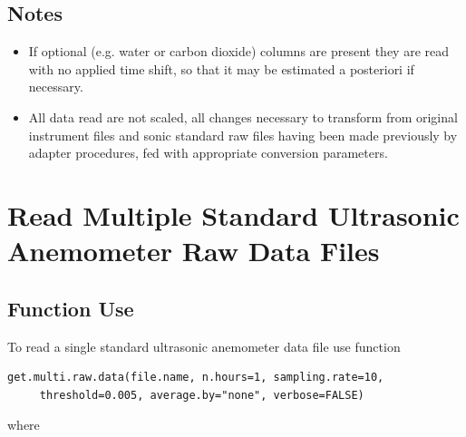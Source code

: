 \documentclass[a4paper,10pt]{book}
\begin{document}
\subsection{Notes}

\begin{itemize}
 \item If optional (e.g. water or carbon dioxide) columns are present they are read with no applied time shift, so that it may be estimated a posteriori if necessary.
 \item All data read are not scaled, all changes necessary to transform from original instrument files and sonic standard raw files having been made previously by adapter procedures, fed with appropriate conversion parameters. 
\end{itemize}


\section{Read Multiple Standard Ultrasonic Anemometer Raw Data Files}
\label{sec:Get Multiple Raw Data Files}

\subsection{Function Use}

To read a single standard ultrasonic anemometer data file use function

\begin{verbatim}
get.multi.raw.data(file.name, n.hours=1, sampling.rate=10,
     threshold=0.005, average.by="none", verbose=FALSE)
\end{verbatim}

\noindent where
\end{document}
